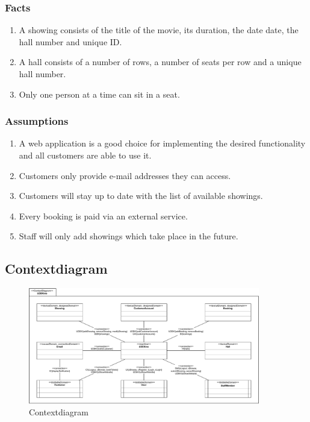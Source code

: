 \documentclass[a4paper,10pt,titlepage,bibtotoc,bibtotocnumbered]{scrreprt}
\begin{document}
\subsubsection{Facts}
\begin{enumerate}[F1]
	\item A showing consists of the title of the movie, its duration, the date date, the hall number and unique ID.
	\item A hall consists of a number of rows, a number of seats per row and a unique hall number.
    \item Only one person at a time can sit in a seat.
\end{enumerate}

\subsubsection{Assumptions}
\begin{enumerate}[{A}1]
	\item A web application is a good choice for implementing the desired functionality and all customers are able to use it.
	\item Customers only provide e-mail addresses they can access.
    \item Customers will stay up to date with the list of available showings.
    \item Every booking is paid via an external service.
    \item Staff will only add showings which take place in the future.
\end{enumerate}

\subsection{Contextdiagram}
\begin{figure}[H]
	\centering
  	\includegraphics[width=0.9\textwidth]{figures/02/a02_context_diagram.pdf}
	\caption{Contextdiagram}
	\label{figure:contextDiagram}
\end{figure}
\end{document}
